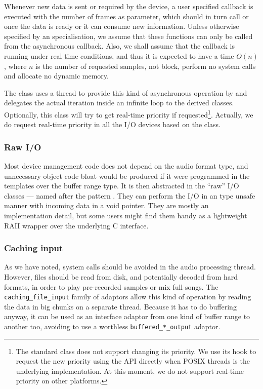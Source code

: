 Whenever new data is sent or required by the device, a user specified
callback is executed with the number of frames as
parameter, which should in turn call  or 
once the data is ready or it can consume new information. Unless
otherwise specified by an specialisation, we assume that these
functions can only be called from the asynchronous callback. Also, we
shall assume that the callback is running under real time conditions,
and thus it is expected to have a time $O(n)$, where $n$ is the number
of requested samples, not block, perform no system calls and allocate
no dynamic memory.

The  class uses a thread to provide this kind of
asynchronous operation by and delegates the actual iteration inside an
infinite loop to the derived classes. Optionally, this class will try
to get real-time priority if requested\footnote{The 
  standard class does not support changing its priority. We use its
   hook to request the new priority using the
   API directly when POSIX threads is the underlying
  implementation. At this moment, we do not support real-time priority
  on other platforms.}. Actually, we do request real-time priority in
all the I/O devices based on the 
class.


\subsubsection{Raw I/O}

Most device management code does not depend on the audio format type,
and unnecessary object code bloat would be produced if it were
programmed in the templates over the buffer range type. It is then
abstracted in the ``raw'' I/O classes --- named after the pattern
. They can perform the I/O in an type
unsafe manner with incoming data in a void pointer. They are mostly an
implementation detail, but some users might find them handy as a
lightweight RAII wrapper over the underlying C interface.

\subsubsection{Caching input}

As we have noted, system calls should be avoided
in the audio processing thread. However, files should be read from
disk, and potentially decoded from hard formats, in order to play
pre-recorded samples or mix full songs. The
\texttt{caching\_file\_input} family of adaptors allow this kind of
operation by reading the data in big chunks on a separate
thread. Because it has to do buffering anyway, it can be used as an
interface adaptor from one kind of buffer range to another too,
avoiding to use a worthless \texttt{buffered\_*\_output} adaptor.

